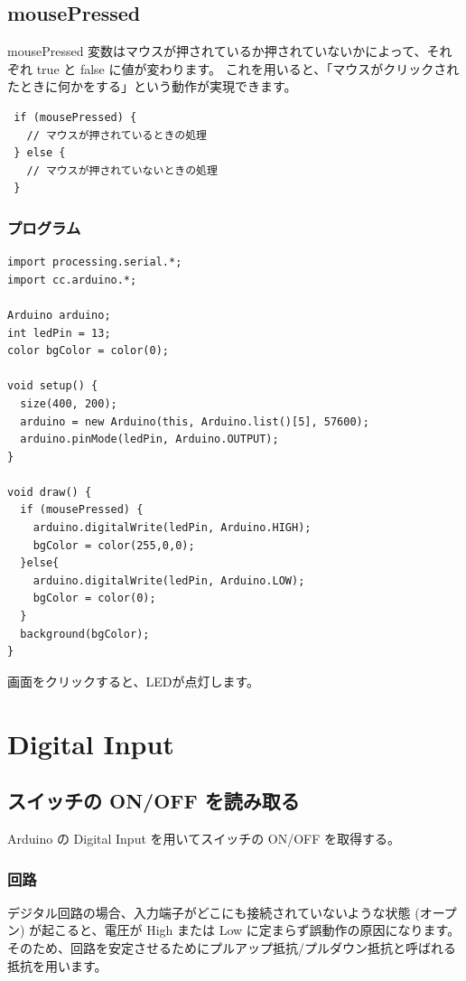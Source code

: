 \documentclass[11pt,a4paper]{jarticle}
\begin{document}
\subsection*{mousePressed}
mousePressed 変数はマウスが押されているか押されていないかによって、それぞれ true と false に値が変わります。
これを用いると、「マウスがクリックされたときに何かをする」という動作が実現できます。

\begin{lstlisting}
 if (mousePressed) {
   // マウスが押されているときの処理
 } else {
   // マウスが押されていないときの処理
 }
\end{lstlisting}

\subsubsection*{プログラム}
\begin{lstlisting}
import processing.serial.*;
import cc.arduino.*;
 
Arduino arduino;
int ledPin = 13;
color bgColor = color(0);
 
void setup() {
  size(400, 200);
  arduino = new Arduino(this, Arduino.list()[5], 57600);
  arduino.pinMode(ledPin, Arduino.OUTPUT);
}
 
void draw() {
  if (mousePressed) {
    arduino.digitalWrite(ledPin, Arduino.HIGH);
    bgColor = color(255,0,0);
  }else{
    arduino.digitalWrite(ledPin, Arduino.LOW);
    bgColor = color(0);
  }
  background(bgColor);
}
\end{lstlisting}
画面をクリックすると、LEDが点灯します。

\section{Digital Input}
\subsection{スイッチの ON/OFF を読み取る}
Arduino の Digital Input を用いてスイッチの ON/OFF を取得する。

\subsubsection*{回路}
デジタル回路の場合、入力端子がどこにも接続されていないような状態 (オープン) が起こると、電圧が High または Low に定まらず誤動作の原因になります。
そのため、回路を安定させるためにプルアップ抵抗/プルダウン抵抗と呼ばれる抵抗を用います。
\end{document}
